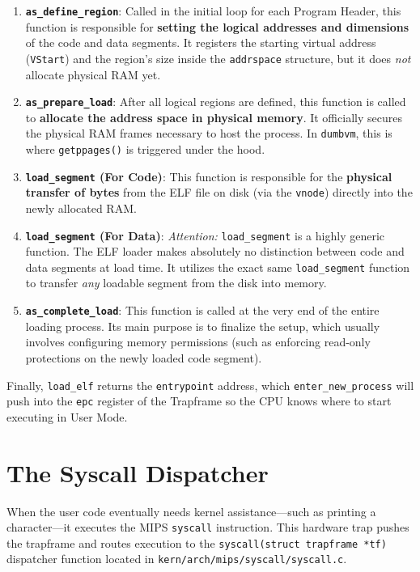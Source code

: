 \begin{enumerate}
    \item \textbf{\texttt{as\_define\_region}}: Called in the initial loop for each Program Header, this function is responsible for \textbf{setting the logical addresses and dimensions} of the code and data segments. It registers the starting virtual address (\texttt{VStart}) and the region's size inside the \texttt{addrspace} structure, but it does \textit{not} allocate physical RAM yet.
    \item \textbf{\texttt{as\_prepare\_load}}: After all logical regions are defined, this function is called to \textbf{allocate the address space in physical memory}. It officially secures the physical RAM frames necessary to host the process. In \texttt{dumbvm}, this is where \texttt{getppages()} is triggered under the hood.
    \item \textbf{\texttt{load\_segment} (For Code)}: This function is responsible for the \textbf{physical transfer of bytes} from the ELF file on disk (via the \texttt{vnode}) directly into the newly allocated RAM. 
    \item \textbf{\texttt{load\_segment} (For Data)}: \textit{Attention:} \texttt{load\_segment} is a highly generic function. The ELF loader makes absolutely no distinction between code and data segments at load time. It utilizes the exact same \texttt{load\_segment} function to transfer \textit{any} loadable segment from the disk into memory.
    \item \textbf{\texttt{as\_complete\_load}}: This function is called at the very end of the entire loading process. Its main purpose is to finalize the setup, which usually involves configuring memory permissions (such as enforcing read-only protections on the newly loaded code segment).
\end{enumerate}
Finally, \texttt{load\_elf} returns the \texttt{entrypoint} address, which \texttt{enter\_new\_process} will push into the \texttt{epc} register of the Trapframe so the CPU knows where to start executing in User Mode.

\section{The Syscall Dispatcher}
When the user code eventually needs kernel assistance—such as printing a character—it executes the MIPS \texttt{syscall} instruction. This hardware trap pushes the trapframe and routes execution to the \texttt{syscall(struct trapframe *tf)} dispatcher function located in \texttt{kern/arch/mips/syscall/syscall.c}. 

